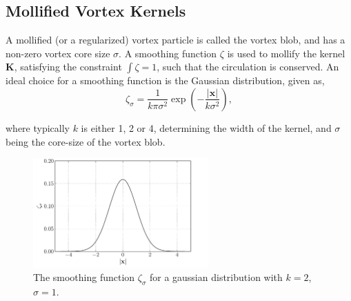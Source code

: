 

\subsection{Mollified Vortex Kernels}
\label{subsec:mvk}
A mollified (or a regularized) vortex particle is called the vortex blob, and has a non-zero vortex core size $\sigma$. A smoothing function $\zeta$ is used to mollify the kernel $\mathbf{K}$, satisfying the constraint $\int \zeta = 1$, such that the circulation is conserved. An ideal choice for a smoothing function is the Gaussian distribution, given as,
	\begin{equation}
	\zeta_{\sigma} = \frac{1}{k\pi\sigma^2}\exp\left(-\frac{\left|\mathbf{x}\right|}{k\sigma^2}\right),
	\end{equation}

where typically $k$ is either 1, 2 or 4, determining the width of the kernel, and $\sigma$ being the core-size of the vortex blob.
	\begin{figure}[!b]
	\centering
	\includegraphics[width=0.6\textwidth]{figures/lagrangian/gaussianKernel.pdf}
	\caption{The smoothing function $\zeta_{\sigma}$ for a gaussian distribution with $k=2$, $\sigma=1$.}
	\label{fig:gaussianDistribution}
	\end{figure}

